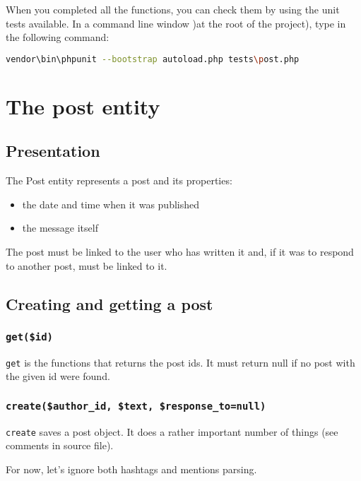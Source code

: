 \documentclass[twoside,a4paper,12pt]{article}
\begin{document}
When you completed all the functions, you can check them by using the unit tests available. In a command line window )at the root of the project), type in the following command:

\begin{lstlisting}[language=bash]
vendor\bin\phpunit --bootstrap autoload.php tests\post.php
\end{lstlisting}

\section{The post entity}

\subsection{Presentation}

The Post entity represents a post and its properties:

\begin{itemize}
\item the date and time when it was published
\item the message itself
\end{itemize}

The post must be linked to the user who has written it and, if it was to respond to another post, must be linked to it.

\subsection{Creating and getting a post}

\subsubsection{\texttt{get(\$id)}}

\texttt{get} is the functions that returns the post ids. It must return null if no post with the given id were found.

\subsubsection{\texttt{create(\$author\_id, \$text, \$response\_to=null)}}

\texttt{create} saves a post object. It does a rather important number of things (see comments in source file).

For now, let's ignore both hashtags and mentions parsing.
\end{document}
